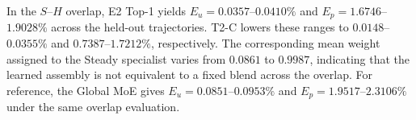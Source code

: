 In the $S$--$H$ overlap, E2 Top-1 yields $E_u=0.0357$--$0.0410\%$ and
$E_p=1.6746$--$1.9028\%$ across the held-out trajectories. T2-C lowers these ranges to $0.0148$--$0.0355\%$ and $0.7387$--$1.7212\%$, respectively. The corresponding mean weight assigned to the Steady specialist varies from $0.0861$ to $0.9987$, indicating that the learned assembly is not equivalent to a fixed blend across the overlap. For reference, the Global MoE gives $E_u=0.0851$--$0.0953\%$ and $E_p=1.9517$--$2.3106\%$ under the same overlap evaluation.
